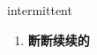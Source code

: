 
\begin{frame}
{\huge intermittent}
\begin{center}
\begin{enumerate}\Large
  \item \textbf{断断续续的}
\end{enumerate}
\end{center}
\end{frame}
